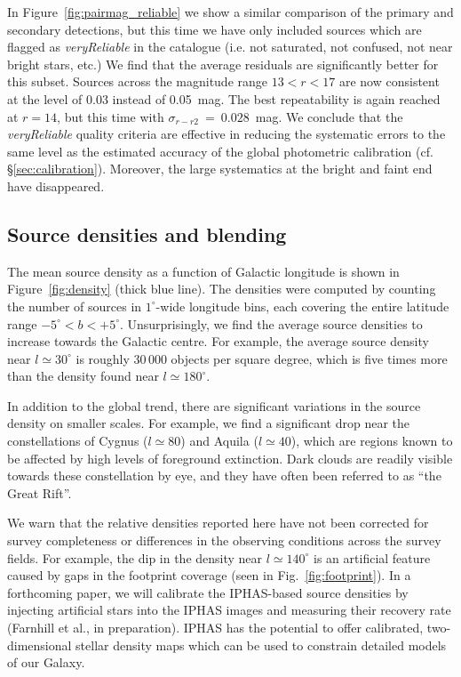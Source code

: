 \documentclass[useAMS,usenatbib]{mn2e}
\begin{document}
In Figure~\ref{fig:pairmag_reliable} we show 
a similar comparison of the primary and secondary detections,
but this time we have only included sources which are flagged
as \emph{veryReliable} in the catalogue
(i.e. not saturated, not confused, not near bright stars, etc.)
We find that the average residuals are significantly better
for this subset. Sources across the magnitude range 
$13 < r < 17$ are now consistent at the level of 0.03 instead of 0.05~mag.
The best repeatability is again reached at $r=14$,
but this time with $\sigma_{r-r2}~=~0.028$~mag.
We conclude that the \emph{veryReliable} quality criteria are effective
in reducing the systematic errors to
the same level as the estimated accuracy of the
global photometric calibration (cf. \S\ref{sec:calibration}).
Moreover, the large systematics at the bright and faint end
have disappeared.

\subsection{Source densities and blending}
\label{sec:densities}

The mean source density as a function of Galactic longitude
is shown in Figure~\ref{fig:density} (thick blue line).
The densities were computed by counting the 
number of sources in $1^\circ$-wide longitude bins,
each covering the entire latitude range $-5^\circ<b<+5^\circ$.
Unsurprisingly, we find the average source densities to increase
towards the Galactic centre.
For example, the average source density near $l\simeq 30^\circ$
is roughly 30\,000 objects per square degree,
which is five times more than the density
found near $l\simeq 180^\circ$.

In addition to the global trend, 
there are significant variations
in the source density on smaller scales.
For example,  we find a significant drop near the constellations 
of Cygnus ($l\simeq 80$) and Aquila ($l\simeq 40$),
which are regions known to be affected
by high levels of foreground extinction.
Dark clouds are readily visible towards these constellation by eye,
and they have often been referred to as ``the Great Rift''.

We warn that the relative densities reported here 
have not been corrected for survey completeness
or differences in the observing conditions across the survey fields.
For example, the dip in the density near $l\simeq140^\circ$
is an artificial feature caused by gaps
in the footprint coverage (seen in Fig.~\ref{fig:footprint}).
In a forthcoming paper,
we will calibrate the IPHAS-based source densities
by injecting artificial stars into the IPHAS images
and measuring their recovery rate (Farnhill et al., in preparation).
IPHAS has the potential to offer
calibrated, two-dimensional stellar density maps
which can be used to constrain detailed models of our Galaxy.
\end{document}
